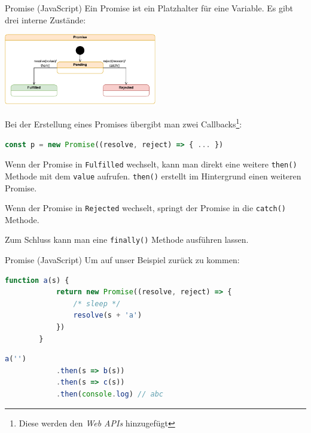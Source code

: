 \begin{defi}{Promise (JavaScript)}
    Ein Promise ist ein Platzhalter für eine Variable.
    Es gibt drei interne Zustände:

    \begin{center}
        \includegraphics[width=0.5\textwidth]{includes/figures/defi_promise.pdf}
    \end{center}

    Bei der Erstellung eines Promises übergibt man zwei Callbacks\footnote{Diese werden den \emph{Web APIs} hinzugefügt}:
    \begin{lstlisting}[language=JavaScript]
        const p = new Promise((resolve, reject) => { ... })
    \end{lstlisting}

    Wenn der Promise in \texttt{Fulfilled} wechselt, kann man direkt eine weitere \texttt{then()} Methode mit dem \texttt{value} aufrufen.
    \texttt{then()} erstellt im Hintergrund einen weiteren Promise.

    Wenn der Promise in \texttt{Rejected} wechselt, springt der Promise in die \texttt{catch()} Methode.

    Zum Schluss kann man eine \texttt{finally()} Methode ausführen lassen.
\end{defi}

\begin{example}{Promise (JavaScript)}
    Um auf unser Beispiel zurück zu kommen:
    \begin{lstlisting}[language=JavaScript]
        function a(s) {
            return new Promise((resolve, reject) => {
                /* sleep */
                resolve(s + 'a')
            })
        }
    \end{lstlisting}

    \begin{lstlisting}[language=JavaScript]
        a('')
            .then(s => b(s))
            .then(s => c(s))
            .then(console.log) // abc
    \end{lstlisting}
\end{example}

